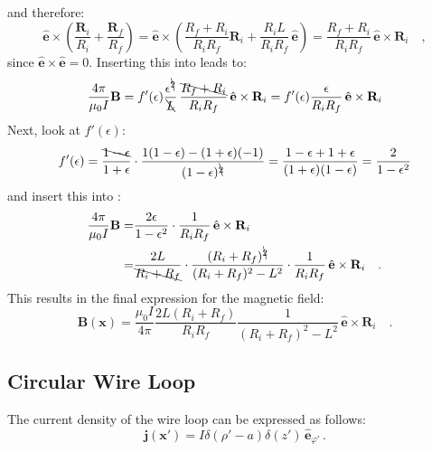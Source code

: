 and therefore:
\begin{equation}
   \hat{\mathbf{e}} \times \left( \frac{\mathbf{R}_i}{R_i} + \frac{\mathbf{R}_f}{R_f} \right)
 = \hat{\mathbf{e}} \times \left( \frac{R_f+R_i}{R_i R_f} \mathbf{R}_i + \frac{R_i L}{R_i R_f} \, \hat{\mathbf{e}} \right)
 = \frac{R_f+R_i}{R_i R_f} \, \hat{\mathbf{e}} \times \mathbf{R}_i \quad ,
\end{equation}
since $\hat{\mathbf{e}} \times \hat{\mathbf{e}} = 0$.
Inserting this into  leads to:
\begin{equation}
   \frac{4 \pi}{\mu_0 I} \mathbf{B}
 = f'(\epsilon) \frac{\epsilon^{\bcancel{2}}}{\bcancel{L}} \, \frac{\bcancel{R_f+R_i}}{R_i R_f} \, \hat{\mathbf{e}} \times \mathbf{R}_i
 = f'(\epsilon) \frac{\epsilon}{R_i R_f} \, \hat{\mathbf{e}} \times \mathbf{R}_i \label{eqn:B_intermediate_2}
\end{equation}
Next, look at $f'(\epsilon)$:
\begin{equation}
   f'(\epsilon)
 = \frac{\bcancel{1 - \epsilon}}{1 + \epsilon} \cdot \frac{1 (1-\epsilon) - (1+\epsilon) (-1)}{(1 - \epsilon)^{\bcancel{2}}}
 = \frac{1 - \epsilon + 1 + \epsilon}{(1 + \epsilon)(1 - \epsilon)}
 = \frac{2}{1 - \epsilon^2}
\end{equation}
and insert this into :
\begin{align}
   \frac{4 \pi}{\mu_0 I} \mathbf{B}
 = & \frac{2 \epsilon}{1 - \epsilon^2} \cdot \frac{1}{R_i R_f} \, \hat{\mathbf{e}} \times \mathbf{R}_i \\
 = & \frac{2 L}{\bcancel{R_i + R_f}} \cdot \frac{(R_i + R_f)^{\bcancel{2}}}{(R_i + R_f)^2 - L^2} \cdot \frac{1}{R_i R_f} \, \hat{\mathbf{e}} \times \mathbf{R}_i \quad .
\end{align}
This results in the final expression for the magnetic field:
\begin{equation}
 \boxed{\mathbf{B} (\mathbf{x}) = \frac{\mu_0 I}{4 \pi} \frac{2 L (R_i + R_f)}{R_i R_f} \frac{1}{(R_i + R_f)^2 - L^2} \, \hat{\mathbf{e}} \times \mathbf{R}_i } \quad .
\end{equation}

\subsection{Circular Wire Loop}
The current density of the wire loop can be expressed as follows:
\begin{equation}
  \mathbf{j}(\mathbf{x}') = I \delta(\rho' - a) \delta(z') \,\hat{\mathbf{e}}_{\varphi'} \, .
\end{equation}

